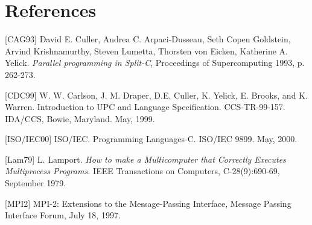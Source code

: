 \pagebreak
\section*{References}

[CAG93]  David E. Culler, Andrea C. Arpaci-Dusseau, Seth Copen Goldstein,
  Arvind Krishnamurthy, Steven Lumetta, Thorsten von Eicken, Katherine A. Yelick.
  {\em Parallel programming in Split-C},  
  Proceedings of Supercomputing 1993, p. 262-273.

[CDC99] W. W. Carlson, J. M. Draper, D.E. Culler, K. Yelick,
   E. Brooks, and K.  Warren.  Introduction to UPC and Language
   Specification.  CCS-TR-99-157. IDA/CCS, Bowie, Maryland.  May,
   1999.

[ISO/IEC00] ISO/IEC.  Programming Languages-C. ISO/IEC 9899. May, 2000.

[Lam79] L. Lamport. {\em How to make a Multicomputer that Correctly Executes
  Multiprocess Programs.} IEEE Transactions on Computers, C-28(9):690-69,
  September 1979.
  
[MPI2] MPI-2: Extensions to the Message-Passing Interface,
  Message Passing Interface Forum, July 18, 1997.
